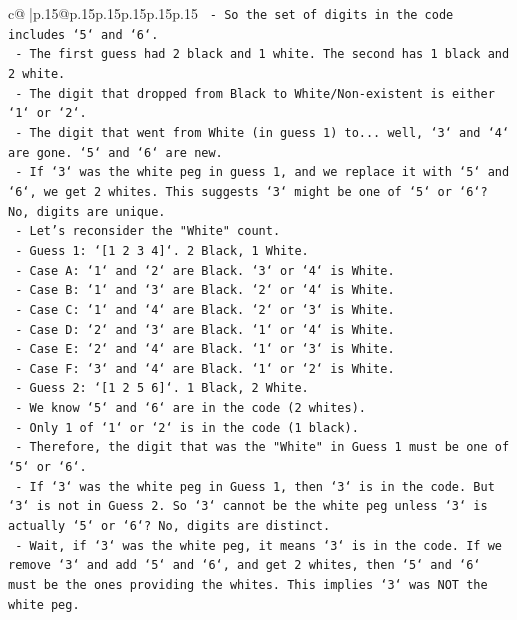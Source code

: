 \documentclass{article}
\begin{document}
{\begin{supertabular}{c@{$\;$}|p{.15\linewidth}@{}p{.15\linewidth}p{.15\linewidth}p{.15\linewidth}p{.15\linewidth}p{.15\linewidth}}
{{{\texttt{    {-} So the set of digits in the code includes `5` and `6`.} \\
\texttt{    {-} The first guess had 2 black and 1 white. The second has 1 black and 2 white.} \\
\texttt{    {-} The digit that dropped from Black to White/Non{-}existent is either `1` or `2`.} \\
\texttt{    {-} The digit that went from White (in guess 1) to... well, `3` and `4` are gone. `5` and `6` are new.} \\
\texttt{    {-} If `3` was the white peg in guess 1, and we replace it with `5` and `6`, we get 2 whites. This suggests `3` might be one of `5` or `6`? No, digits are unique.} \\
\texttt{    {-} Let's reconsider the "White" count.} \\
\texttt{    {-} Guess 1: `{[}1 2 3 4{]}`. 2 Black, 1 White.} \\
\texttt{        {-} Case A: `1` and `2` are Black. `3` or `4` is White.} \\
\texttt{        {-} Case B: `1` and `3` are Black. `2` or `4` is White.} \\
\texttt{        {-} Case C: `1` and `4` are Black. `2` or `3` is White.} \\
\texttt{        {-} Case D: `2` and `3` are Black. `1` or `4` is White.} \\
\texttt{        {-} Case E: `2` and `4` are Black. `1` or `3` is White.} \\
\texttt{        {-} Case F: `3` and `4` are Black. `1` or `2` is White.} \\
\texttt{    {-} Guess 2: `{[}1 2 5 6{]}`. 1 Black, 2 White.} \\
\texttt{        {-} We know `5` and `6` are in the code (2 whites).} \\
\texttt{        {-} Only 1 of `1` or `2` is in the code (1 black).} \\
\texttt{        {-} Therefore, the digit that was the "White" in Guess 1 must be one of `5` or `6`.} \\
\texttt{        {-} If `3` was the white peg in Guess 1, then `3` is in the code. But `3` is not in Guess 2. So `3` cannot be the white peg unless `3` is actually `5` or `6`? No, digits are distinct.} \\
\texttt{        {-} Wait, if `3` was the white peg, it means `3` is in the code. If we remove `3` and add `5` and `6`, and get 2 whites, then `5` and `6` must be the ones providing the whites. This implies `3` was NOT the white peg.} \\
}}}
\end{supertabular}}
\end{document}
